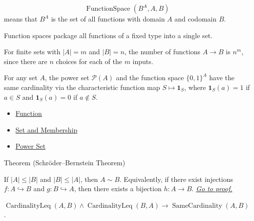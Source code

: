 \begin{remark*}
\[
  \operatorname{FunctionSpace}(B^A,A,B)
\] means that $B^A$ is the set of all
functions with domain $A$ and codomain $B$.
\end{remark*}

\begin{remark*}[Interpretation]
Function spaces package all functions of a fixed type into a single set.
\end{remark*}

\begin{remark*}[Exposition]
For finite sets with $|A|=m$ and $|B|=n$, the number of functions $A\to B$ is
$n^m$, since there are $n$ choices for each of the $m$ inputs.
\end{remark*}

\begin{remark*}[Exposition]
For any set $A$, the power set $\mathcal{P}(A)$ and the function space
\(\{0,1\}^A\) have the same cardinality via the characteristic function map
$S\mapsto \mathbf{1}_S$, where $\mathbf{1}_S(a)=1$ if $a\in S$ and
$\mathbf{1}_S(a)=0$ if $a\notin S$.
\end{remark*}

\begin{dependencies}
\begin{itemize}
  \item \hyperref[def:function]{Function}
  \item \hyperref[def:set-membership]{Set and Membership}
  \item \hyperref[def:power-set]{Power Set}
\end{itemize}
\end{dependencies}


\begin{theorembox}{Theorem (Schr\"{o}der--Bernstein Theorem)}
\begin{theorem}\label{thm:schroder-bernstein}
If $|A|\leq |B|$ and $|B|\leq |A|$, then $A\sim B$.
Equivalently, if there exist injections $f:A\hookrightarrow B$ and
$g:B\hookrightarrow A$, then there exists a bijection $h:A\to B$.
\hyperref[prf:schroder-bernstein]{\textit{Go to proof.}}
\end{theorem}
\end{theorembox}

\begin{remark*}
$\operatorname{CardinalityLeq}(A,B)\wedge\operatorname{CardinalityLeq}(B,A)
\to \operatorname{SameCardinality}(A,B)$.
\end{remark*}




